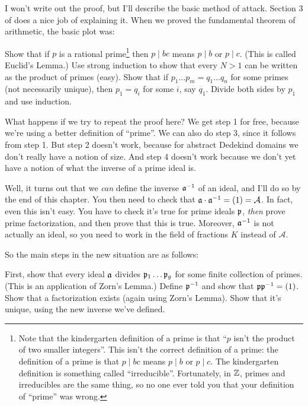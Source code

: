 I won't write out the proof, but I'll describe the basic method of attack.
Section 3 of \cite{ref:ullery} does a nice job of explaining it.
When we proved the fundamental theorem of arithmetic, the basic plot was:
\begin{enumerate}[(1)]
	\ii Show that if $p$ is a rational prime\footnote{
		Note that the kindergarten definition of a prime is
		that ``$p$ isn't the product of two smaller integers''.
		This isn't the correct definition of a prime:
		the definition of a prime is that $p \mid bc$
		means $p \mid b$ or $p \mid c$.
		The kindergarten definition is something called ``irreducible''.
		Fortunately, in $\mathbb Z$, primes and irreducibles are the same thing,
		so no one ever told you that your definition of ``prime'' was wrong.}
	then $p \mid bc$ means $p \mid b$ or $p \mid c$.  (This is called Euclid's Lemma.)
	\ii Use strong induction to show that every $N > 1$ can be written as the product of primes (easy).
	\ii Show that if $p_1 \dots p_m = q_1 \dots q_n$ for some primes (not necessarily unique),
	then $p_1 = q_i$ for some $i$, say $q_1$.
	\ii Divide both sides by $p_1$ and use induction.
\end{enumerate}
What happens if we try to repeat the proof here?
We get step 1 for free, because we're using a better definition of ``prime''.
We can also do step 3, since it follows from step 1.
But step 2 doesn't work,
because for abstract Dedekind domains
we don't really have a notion of size.
And step 4 doesn't work because we don't yet have a
notion of what the inverse of a prime ideal is.

Well, it turns out that we \emph{can} define the inverse $\mathfrak a^{-1}$ of an ideal,
and I'll do so by the end of this chapter.
You then need to check that $\mathfrak a \cdot \mathfrak a^{-1} = (1) = \mathcal A$.
In fact, even this isn't easy.
You have to check it's true for prime ideals $\mathfrak p$,
\emph{then} prove prime factorization,
and then prove that this is true.
Moreover, $\mathfrak a^{-1}$ is not actually an ideal, so you need to
work in the field of fractions $K$ instead of $\mathcal A$.

So the main steps in the new situation are as follows:
\begin{enumerate}[(1)]
	\ii First, show that every ideal $\mathfrak a$ divides $\mathfrak p_1 \dots \mathfrak p_g$
	for some finite collection of primes.
	(This is an application of Zorn's Lemma.)
	\ii Define $\mathfrak p^{-1}$ and show that $\mathfrak p \mathfrak p^{-1} = (1)$.
	\ii Show that a factorization exists (again using Zorn's Lemma).
	\ii Show that it's unique, using the new inverse we've defined.
\end{enumerate}

